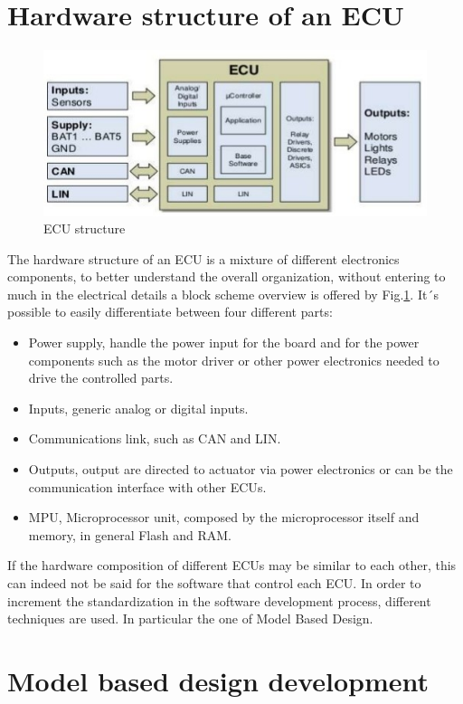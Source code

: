 \documentclass[../main.tex]{subfiles}
\begin{document}
\section{Hardware structure of an ECU}
\begin{figure}[h]
    \centering
    \includegraphics[width=\linewidth]{images_folder/electronic-control-unitecu-6-638.jpg}
    \caption{ECU structure}
    \label{fig:ECUHW}
\end{figure}
The hardware structure of an \gls{ECU} is a mixture of different electronics components, to better understand the overall organization, without entering to much in the electrical details a block scheme overview is offered by Fig.\ref{fig:ECUHW}. It´s possible to easily differentiate between four different parts:
\begin{itemize}
    \item Power supply, handle the power input for the board and for the power components such as the motor driver or other power electronics needed to drive the controlled parts. 
    \item Inputs, generic analog or digital inputs.
    \item Communications link, such as \gls{CAN} and \gls{LIN}.
    \item Outputs, output are directed to actuator via power electronics or can be the communication interface with other \gls{ECU}s.
    \item \gls{MPU}, Microprocessor unit, composed by the microprocessor itself and memory, in general Flash and \gls{RAM}. 
\end{itemize}
If the hardware composition of different \gls{ECU}s may be similar to each other, this can indeed not be said for the software that control each \gls{ECU}. In order to increment the standardization in the software development process, different techniques are used. In particular the one of Model Based Design. 
\section{Model based design development}
\end{document}
